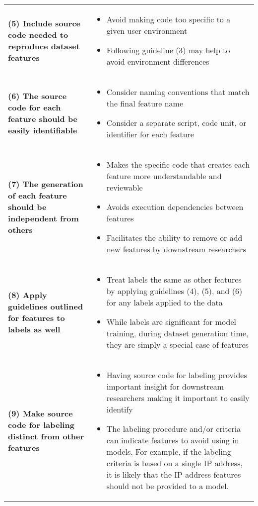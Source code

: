\documentclass[sigconf, anonymous, screen]{acmart}
\begin{document}
\begin{table*}
\begin{tabular}{m{8cm} m{8cm}}
    \textbf{(5) Include source code needed to reproduce dataset features} &
    \begin{itemize}
        \item Avoid making code too specific to a given user environment
        \item Following guideline (3) may help to avoid environment differences
    \end{itemize} \\

    \textbf{(6) The source code for each feature should be easily identifiable} &
    \begin{itemize}
        \item Consider naming conventions that match the final  feature name
        \item Consider a separate script, code unit, or identifier for each feature
    \end{itemize} \\

    \textbf{(7) The generation of each feature should be independent from others} &
    \begin{itemize}
        \item Makes the specific code that creates each feature more understandable and reviewable
        \item Avoids execution dependencies between features
        \item Facilitates the ability to remove or add new features by downstream researchers
    \end{itemize} \\

    \textbf{(8) Apply guidelines outlined for features to labels as well} &
    \begin{itemize}
        \item Treat labels the same as other features by applying guidelines (4), (5), and (6) for any labels applied to the data
        \item While labels are significant for model training, during dataset generation time, they are simply a special case of features
    \end{itemize} \\

    \textbf{(9) Make source code for labeling distinct from other features} &
    \begin{itemize}
        \item Having source code for labeling provides important insight for downstream researchers making it important to easily identify
        \item The labeling procedure and/or criteria can indicate features to avoid using in models.
              For example, if the labeling criteria is based on a single IP address, it is likely that the IP address features should not be provided to a model.
    \end{itemize} \\


\end{tabular}
\end{table*}
\end{document}
